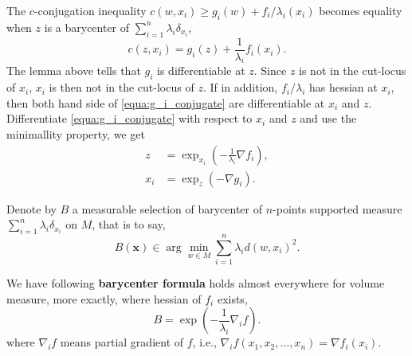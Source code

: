 The $c$-conjugation inequality
$ c(w, x_i) \geq g_i(w) + f_i / \lambda_i (x_i)$
becomes equality when $z$ is a barycenter of $\sum_{i=1}^{n} \lambda_i \delta_{x_i}$,
\begin{equation}
	\label{equa:g_i_conjugate}
	c(z, x_i) = g_i(z) + \frac{1}{\lambda_i} f_i(x_i).
\end{equation}
The lemma above tells that $g_i$ is differentiable at $z$.
Since $z$ is not in the cut-locus of $x_i$,
$x_i$ is then not in the cut-locus of $z$.
If in addition, $f_i / \lambda_i$ has hessian at $x_i$,
then both hand side of \cref{equa:g_i_conjugate} are differentiable at $x_i$ and $z$.
Differentiate \cref{equa:g_i_conjugate} with respect to $x_i$ and $z$ and use the minimallity property,
we get
\begin{align*}
	z   & = \exp_{x_i}( - \frac{1}{\lambda_i} \nabla f_i), \\
	x_i & = \exp_{z}( - \nabla g_i).
\end{align*}


Denote by $B$ a measurable selection of barycenter of
$n$-points supported measure $\sum_{i=1}^{n} \lambda_i \delta_{x_i}$ on $M$,
that is to say,
\[
	B(\boldsymbol{x}) \in \arg \min_{w \in M} \sum_{i=1}^{n} \lambda_i d(w, x_i)^2.
\]


We have following \textbf{barycenter formula} holds almost everywhere for volume measure,
more exactly, where hessian of $f_i$ exists,
\begin{equation}
	\label{formula_barycenter}
	B = \exp (- \frac{1}{\lambda_i} \nabla_i f).
\end{equation}
where $\nabla_i f$ means partial gradient of $f$,
i.e., $\nabla_i f (x_1, x_2, \ldots, x_n)  = \nabla f_i (x_i)$.

